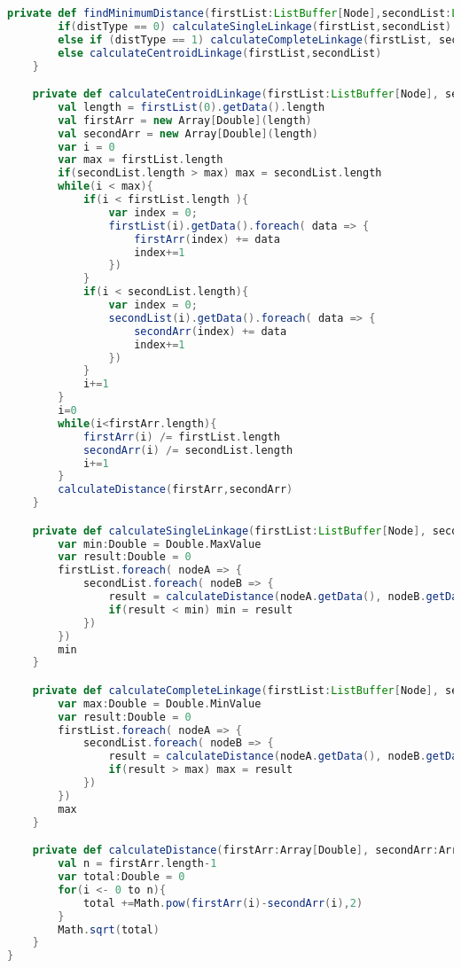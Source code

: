 \begin{lstlisting}[language=Scala, caption=Dendrogram.scala]
    private def findMinimumDistance(firstList:ListBuffer[Node],secondList:ListBuffer[Node]): Double ={
        if(distType == 0) calculateSingleLinkage(firstList,secondList)
        else if (distType == 1) calculateCompleteLinkage(firstList, secondList)
        else calculateCentroidLinkage(firstList,secondList)
    }

    private def calculateCentroidLinkage(firstList:ListBuffer[Node], secondList:ListBuffer[Node]): Double ={
        val length = firstList(0).getData().length
        val firstArr = new Array[Double](length)
        val secondArr = new Array[Double](length)
        var i = 0
        var max = firstList.length
        if(secondList.length > max) max = secondList.length
        while(i < max){
            if(i < firstList.length ){
                var index = 0;
                firstList(i).getData().foreach( data => {
                    firstArr(index) += data
                    index+=1
                })
            }
            if(i < secondList.length){
                var index = 0;
                secondList(i).getData().foreach( data => {
                    secondArr(index) += data
                    index+=1
                })
            }
            i+=1
        }
        i=0
        while(i<firstArr.length){
            firstArr(i) /= firstList.length
            secondArr(i) /= secondList.length
            i+=1
        }
        calculateDistance(firstArr,secondArr)
    }

    private def calculateSingleLinkage(firstList:ListBuffer[Node], secondList:ListBuffer[Node]): Double = {
        var min:Double = Double.MaxValue
        var result:Double = 0
        firstList.foreach( nodeA => {
            secondList.foreach( nodeB => {
                result = calculateDistance(nodeA.getData(), nodeB.getData())
                if(result < min) min = result
            })
        })
        min
    }

    private def calculateCompleteLinkage(firstList:ListBuffer[Node], secondList:ListBuffer[Node]): Double = {
        var max:Double = Double.MinValue
        var result:Double = 0
        firstList.foreach( nodeA => {
            secondList.foreach( nodeB => {
                result = calculateDistance(nodeA.getData(), nodeB.getData())
                if(result > max) max = result
            })
        })
        max
    }

    private def calculateDistance(firstArr:Array[Double], secondArr:Array[Double]): Double = {
        val n = firstArr.length-1
        var total:Double = 0
        for(i <- 0 to n){
            total +=Math.pow(firstArr(i)-secondArr(i),2)
        }
        Math.sqrt(total)
    }
}
\end{lstlisting}


